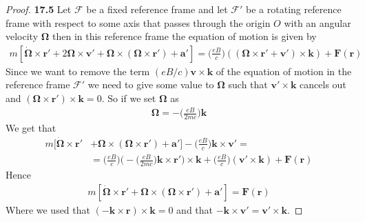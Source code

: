 \documentclass[11pt]{article}
\theoremstyle{definition}
\begin{document}
\begin{proof}{\textbf{17.5}}
    Let $\mathcal{F}$ be a fixed reference frame and let $\mathcal{F}'$ be a
    rotating reference frame with respect to some axis that passes through
    the origin $O$ with an angular velocity $\bm\Omega$ then in this reference
    frame the equation of motion is given by
    \begin{align*}
        m[\bm{\dot\Omega} \times \bm{r}' + 2\bm\Omega \times \bm v'
        + \bm\Omega \times (\bm\Omega \times \bm r') + \bm a'] =
        \bigg(\frac{eB}{c}\bigg)
        ((\bm{\Omega}\times \bm{r}' + \bm{v}')\times \bm{k}) + \bm{F(r)}
    \end{align*}
    Since we want to remove the term $(eB/c)\bm{v}\times \bm{k}$ of the
    equation of motion in the reference frame $\mathcal{F}'$ we need
    to give some value to $\bm\Omega$ such that $\bm{v}' \times \bm{k}$
    cancels out and $(\bm\Omega\times \bm{r}') \times \bm{k} = 0$.
    So if we set $\bm\Omega$ as
    \begin{align*}
        \bm\Omega = -\bigg(\frac{eB}{2mc}\bigg)\bm{k}
    \end{align*}
    We get that
    \begin{align*}
        m[\bm{\dot\Omega} \times \bm{r}'
        &+ \bm\Omega \times (\bm\Omega \times \bm r') + \bm a'] 
        -\bigg(\frac{eB}{c}\bigg)\bm{k} \times \bm v' =\\
        & = \bigg(\frac{eB}{c}\bigg)
        \bigg(-\bigg(\frac{eB}{2mc}\bigg)\bm{k}\times \bm{r}'\bigg)\times \bm{k}
        + \bigg(\frac{eB}{c}\bigg)(\bm{v}'\times \bm{k}) + \bm{F(r)}
    \end{align*}
    Hence
    \begin{align*}
        m[\bm{\dot\Omega} \times \bm{r}'
        + \bm\Omega \times (\bm\Omega \times \bm r') + \bm a'] 
        = \bm{F(r)}
    \end{align*}
    Where we used that $(-\bm{k} \times \bm{r})\times \bm{k} = 0$ and that
    $-\bm{k} \times \bm{v}' = \bm{v}' \times \bm{k}$.


\end{proof}
\end{document}
